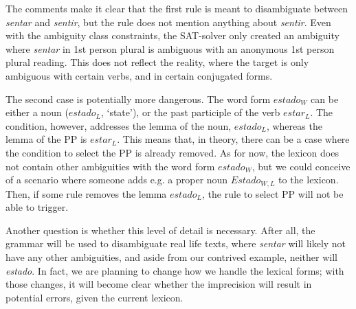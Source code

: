 The comments make it clear that the first rule is meant to disambiguate between \emph{sentar} and \emph{sentir}, but the rule does not mention anything about \emph{sentir}.
Even with the ambiguity class constraints, the SAT-solver only created an ambiguity where \emph{sentar} in 1st person plural is ambiguous with an anonymous 1st person plural reading.
This does not reflect the reality, where the target is only ambiguous with certain verbs, and in certain conjugated forms.

The second case is potentially more dangerous. 
The word form $estado_{W}$ 
can be either a noun ($estado_{L}$, `state'), or the past participle of the verb $estar_{L}$. 
The condition, however, addresses the lemma of the noun, $estado_L$, whereas the lemma of the PP is $estar_{L}$.
This means that, in theory, there can be a case where the condition to select the PP is already removed. As for now, the lexicon does not contain other ambiguities with the word form $estado_{W}$, but we could conceive of a scenario where someone adds e.g. a proper noun $Estado_{W,L}$ to the lexicon. Then, if some rule removes the lemma $estado_{L}$, the rule to select PP will not be able to trigger.


Another question is whether this level of detail is necessary. 
After all, the grammar will be used to disambiguate real life texts, where \emph{sentar} will likely not have any other ambiguities, and aside from our contrived example, neither will \emph{estado}. 
In fact, we are planning to change how we handle the lexical forms; with those changes, it will become clear whether the imprecision will result in potential errors, given the current lexicon. 





